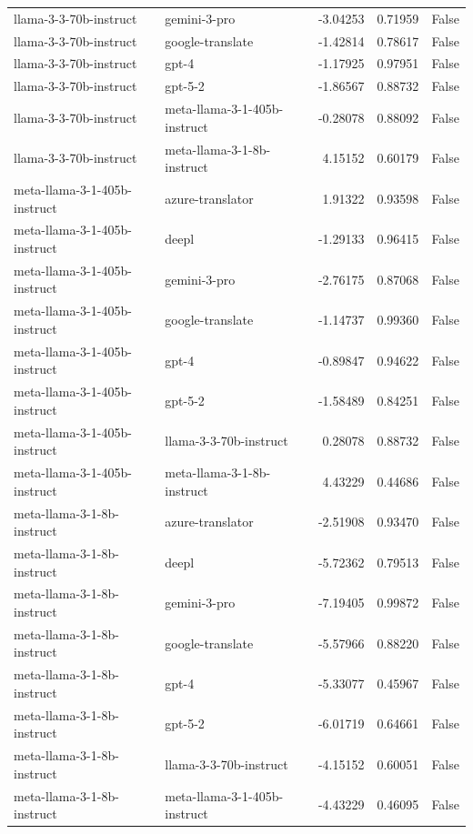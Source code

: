 \begin{tabular}{llrrr}
llama-3-3-70b-instruct & gemini-3-pro & -3.04253 & 0.71959 & False \\
llama-3-3-70b-instruct & google-translate & -1.42814 & 0.78617 & False \\
llama-3-3-70b-instruct & gpt-4 & -1.17925 & 0.97951 & False \\
llama-3-3-70b-instruct & gpt-5-2 & -1.86567 & 0.88732 & False \\
llama-3-3-70b-instruct & meta-llama-3-1-405b-instruct & -0.28078 & 0.88092 & False \\
llama-3-3-70b-instruct & meta-llama-3-1-8b-instruct & 4.15152 & 0.60179 & False \\
meta-llama-3-1-405b-instruct & azure-translator & 1.91322 & 0.93598 & False \\
meta-llama-3-1-405b-instruct & deepl & -1.29133 & 0.96415 & False \\
meta-llama-3-1-405b-instruct & gemini-3-pro & -2.76175 & 0.87068 & False \\
meta-llama-3-1-405b-instruct & google-translate & -1.14737 & 0.99360 & False \\
meta-llama-3-1-405b-instruct & gpt-4 & -0.89847 & 0.94622 & False \\
meta-llama-3-1-405b-instruct & gpt-5-2 & -1.58489 & 0.84251 & False \\
meta-llama-3-1-405b-instruct & llama-3-3-70b-instruct & 0.28078 & 0.88732 & False \\
meta-llama-3-1-405b-instruct & meta-llama-3-1-8b-instruct & 4.43229 & 0.44686 & False \\
meta-llama-3-1-8b-instruct & azure-translator & -2.51908 & 0.93470 & False \\
meta-llama-3-1-8b-instruct & deepl & -5.72362 & 0.79513 & False \\
meta-llama-3-1-8b-instruct & gemini-3-pro & -7.19405 & 0.99872 & False \\
meta-llama-3-1-8b-instruct & google-translate & -5.57966 & 0.88220 & False \\
meta-llama-3-1-8b-instruct & gpt-4 & -5.33077 & 0.45967 & False \\
meta-llama-3-1-8b-instruct & gpt-5-2 & -6.01719 & 0.64661 & False \\
meta-llama-3-1-8b-instruct & llama-3-3-70b-instruct & -4.15152 & 0.60051 & False \\
meta-llama-3-1-8b-instruct & meta-llama-3-1-405b-instruct & -4.43229 & 0.46095 & False \\
\bottomrule
\end{tabular}
